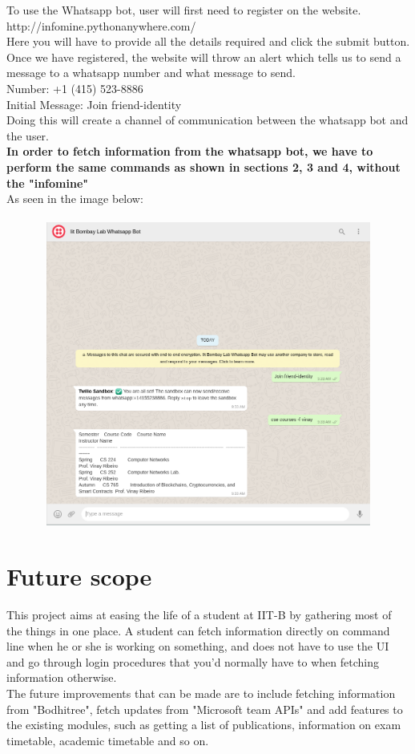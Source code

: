 \documentclass[12pt, letterpaper, twoside]{article}
\begin{document}
To use the Whatsapp bot, user will first need to register on the website.\\
http://infomine.pythonanywhere.com/ \\
Here you will have to provide all the details required and click the submit button. Once we have registered, the website will throw an alert which tells us to send a message to a whatsapp number and what message to send.\\
Number: +1 (415) 523-8886 \\
Initial Message: Join friend-identity \\
Doing this will create a channel of communication between the whatsapp bot and the user. \\
\textbf{In order to fetch information from the whatsapp bot, we have to perform the same commands as shown in sections 2, 3 and 4, without the "infomine"}\\
As seen in the image below: \\
\\
\includegraphics[width=14cm, height=10cm]{whatsappbot}

\section{Future scope}
This project aims at easing the life of a student at IIT-B by gathering most of the things in one place. A student can fetch information directly on command line when he or she is working on something, and does not have to use the UI and go through login procedures that you'd normally have to when fetching information otherwise.\\
The future improvements that can be made are to include fetching information from "Bodhitree", fetch updates from "Microsoft team APIs" and add features to the existing modules, such as getting a list of publications, information on exam timetable, academic timetable and so on.
\end{document}
